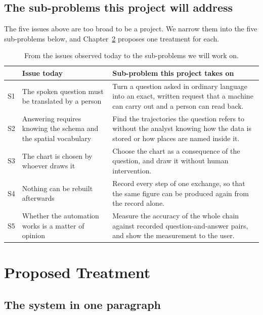 \documentclass[12pt,a4paper]{report}
\begin{document}
\section{The sub-problems this project will address}

The five issues above are too broad to be a project. We narrow them into the
five sub-problems below, and Chapter~\ref{ch:treat} proposes one treatment for
each.

\begin{table}[H]
  \centering
  \caption{From the issues observed today to the sub-problems we will work on.}
  \label{tab:issues}
  \begin{tabular}{@{}p{0.6cm}p{6.0cm}p{8.4cm}@{}}
    \toprule[1.5pt]
    & \textbf{Issue today} & \textbf{Sub-problem this project takes on} \\
    \midrule
    S1 & The spoken question must be translated by a person &
      Turn a question asked in ordinary language into an exact, written request
      that a machine can carry out and a person can read back. \\
    \addlinespace
    S2 & Answering requires knowing the schema and the spatial vocabulary &
      Find the trajectories the question refers to without the analyst knowing
      how the data is stored or how places are named inside it. \\
    \addlinespace
    S3 & The chart is chosen by whoever draws it &
      Choose the chart as a consequence of the question, and draw it without
      human intervention. \\
    \addlinespace
    S4 & Nothing can be rebuilt afterwards &
      Record every step of one exchange, so that the same figure can be produced
      again from the record alone. \\
    \addlinespace
    S5 & Whether the automation works is a matter of opinion &
      Measure the accuracy of the whole chain against recorded
      question-and-answer pairs, and show the measurement to the user. \\
    \bottomrule[1.5pt]
  \end{tabular}
\end{table}

\chapter{Proposed Treatment}
\label{ch:treat}

\section{The system in one paragraph}
\end{document}

